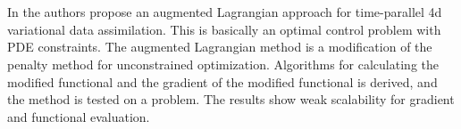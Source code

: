 \\
\\
In \cite{rao2016time} the authors propose an augmented Lagrangian approach for time-parallel 4d variational data assimilation. This is basically an optimal control problem with PDE constraints. The augmented Lagrangian method is a modification of the penalty method for unconstrained optimization. Algorithms for calculating the modified functional and the gradient of the modified functional is derived, and the method is tested on a problem. The results show weak scalability for gradient and functional evaluation. 
